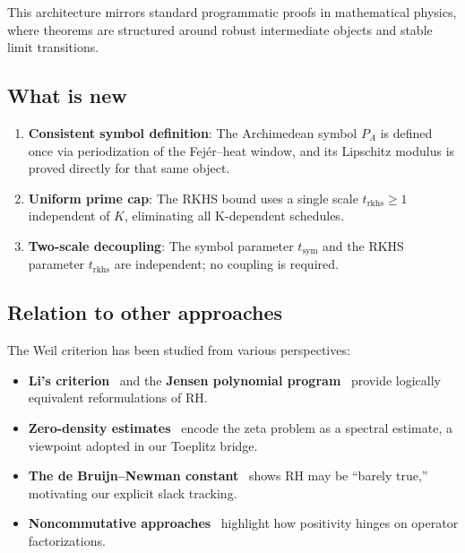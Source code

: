 \documentclass[11pt,a4paper]{article}
\theoremstyle{definition}
\begin{document}
This architecture mirrors standard programmatic proofs in mathematical physics, where theorems are structured around robust intermediate objects and stable limit transitions.

\subsection{What is new}

\begin{enumerate}
\item \textbf{Consistent symbol definition}: The Archimedean symbol $P_A$ is defined once via periodization of the Fej\'er--heat window, and its Lipschitz modulus is proved directly for that same object.

\item \textbf{Uniform prime cap}: The RKHS bound uses a single scale $t_{\mathrm{rkhs}} \ge 1$ independent of $K$, eliminating all K-dependent schedules.

\item \textbf{Two-scale decoupling}: The symbol parameter $t_{\mathrm{sym}}$ and the RKHS parameter $t_{\mathrm{rkhs}}$ are independent; no coupling is required.
\end{enumerate}

\subsection{Relation to other approaches}

The Weil criterion has been studied from various perspectives:

\begin{itemize}
\item \textbf{Li's criterion}~\cite{Li1997} and the \textbf{Jensen polynomial program}~\cite{GriffinOnoRolenZagier2019} provide logically equivalent reformulations of RH.

\item \textbf{Zero-density estimates}~\cite{GuthMaynard2024} encode the zeta problem as a spectral estimate, a viewpoint adopted in our Toeplitz bridge.

\item \textbf{The de Bruijn--Newman constant}~\cite{RodgersTao2020} shows RH may be ``barely true,'' motivating our explicit slack tracking.

\item \textbf{Noncommutative approaches}~\cite{ConnesMarcolli2008} highlight how positivity hinges on operator factorizations.
\end{itemize}
\end{document}
